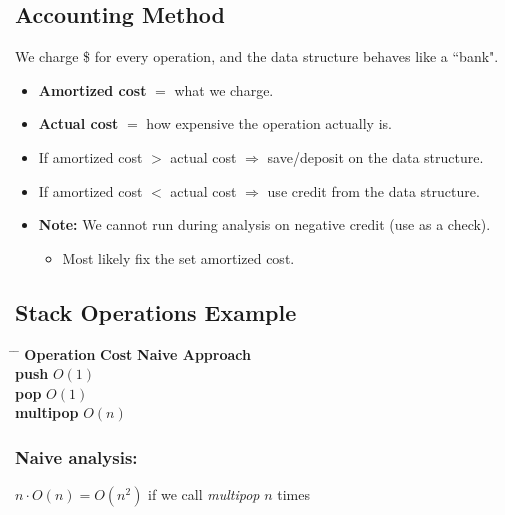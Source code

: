     \subsection{Accounting Method}
    \begin{process}
        We charge \$ for every operation, and the data structure behaves like a ``bank".
        \begin{itemize}
            \item \textbf{Amortized cost} $=$ what we charge.
            \item \textbf{Actual cost} $=$ how expensive the operation actually is.
            \item If amortized cost $>$ actual cost $\Rightarrow$ save/deposit on the data structure.
            \item If amortized cost $<$ actual cost $\Rightarrow$ use credit from the data structure.
            \item \textbf{Note:} We cannot run during analysis on negative credit (use as a check).
            \begin{itemize}
                \item Most likely fix the set amortized cost. 
            \end{itemize}
        \end{itemize}
    \end{process}
    
    \subsection{Stack Operations Example}
    \begin{example}
    \begin{tabbing}
        \hspace*{4cm} \= \hspace*{5cm} \= \kill
        \textbf{Operation} \> \textbf{Cost} \> \textbf{Naive Approach} \\
        \textbf{push} \> $O(1)$ \\
        \textbf{pop} \> $O(1)$ \>  \\
        \textbf{multipop} \> $O(n)$
    \end{tabbing}
    \end{example}

    \subsubsection{Naive analysis:}
    \begin{example}
        $n \cdot O(n)=O(n^2)$ if we call \textit{multipop} $n$ times
    \end{example}
    
